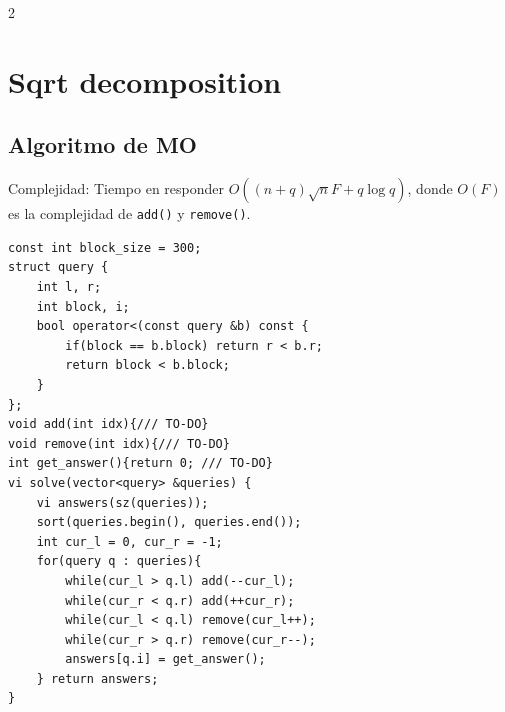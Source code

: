 \documentclass[10pt,spanish,mexico]{article}
\numberwithin{equation}{section}
\begin{document}
\begin{multicols}{2}
\vspace{-1.2\baselineskip}
\hrulefill
\section{Sqrt decomposition}
\subsection{Algoritmo de MO}
Complejidad: Tiempo en responder $O((n + q)\sqrt{n}F + q\log q)$, donde $O(F)$ es la complejidad de \texttt{add()} y \texttt{remove()}.
\begin{verbatim}
const int block_size = 300;
struct query {
    int l, r;
    int block, i;
    bool operator<(const query &b) const {
        if(block == b.block) return r < b.r;
        return block < b.block;
    }
};
void add(int idx){/// TO-DO}
void remove(int idx){/// TO-DO}
int get_answer(){return 0; /// TO-DO}
vi solve(vector<query> &queries) {
    vi answers(sz(queries));
    sort(queries.begin(), queries.end());
    int cur_l = 0, cur_r = -1;
    for(query q : queries){
        while(cur_l > q.l) add(--cur_l);
        while(cur_r < q.r) add(++cur_r);
        while(cur_l < q.l) remove(cur_l++);
        while(cur_r > q.r) remove(cur_r--);
        answers[q.i] = get_answer();
    } return answers;
}
\end{verbatim}



\end{multicols}
\end{document}
